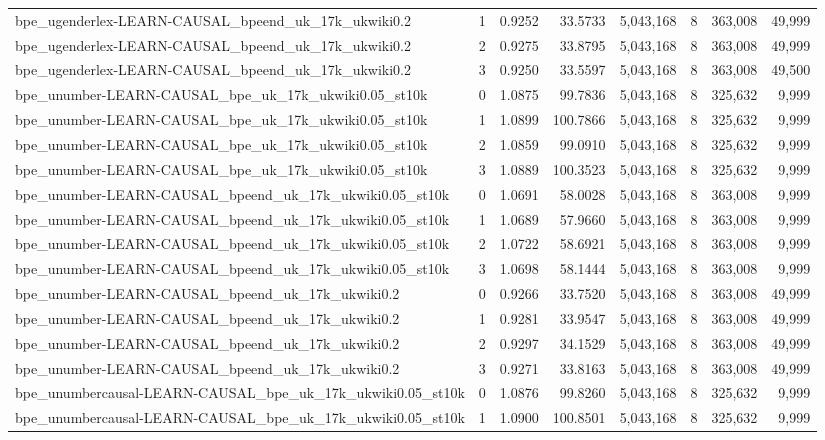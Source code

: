 \begin{tabular}{lrrrrrrr}
bpe\_ugenderlex-LEARN-CAUSAL\_bpeend\_uk\_17k\_ukwiki0.2 & 1 & 0.9252 & 33.5733 & 5,043,168 & 8 & 363,008 & 49,999 \\
bpe\_ugenderlex-LEARN-CAUSAL\_bpeend\_uk\_17k\_ukwiki0.2 & 2 & 0.9275 & 33.8795 & 5,043,168 & 8 & 363,008 & 49,999 \\
bpe\_ugenderlex-LEARN-CAUSAL\_bpeend\_uk\_17k\_ukwiki0.2 & 3 & 0.9250 & 33.5597 & 5,043,168 & 8 & 363,008 & 49,500 \\
bpe\_unumber-LEARN-CAUSAL\_bpe\_uk\_17k\_ukwiki0.05\_st10k & 0 & 1.0875 & 99.7836 & 5,043,168 & 8 & 325,632 & 9,999 \\
bpe\_unumber-LEARN-CAUSAL\_bpe\_uk\_17k\_ukwiki0.05\_st10k & 1 & 1.0899 & 100.7866 & 5,043,168 & 8 & 325,632 & 9,999 \\
bpe\_unumber-LEARN-CAUSAL\_bpe\_uk\_17k\_ukwiki0.05\_st10k & 2 & 1.0859 & 99.0910 & 5,043,168 & 8 & 325,632 & 9,999 \\
bpe\_unumber-LEARN-CAUSAL\_bpe\_uk\_17k\_ukwiki0.05\_st10k & 3 & 1.0889 & 100.3523 & 5,043,168 & 8 & 325,632 & 9,999 \\
bpe\_unumber-LEARN-CAUSAL\_bpeend\_uk\_17k\_ukwiki0.05\_st10k & 0 & 1.0691 & 58.0028 & 5,043,168 & 8 & 363,008 & 9,999 \\
bpe\_unumber-LEARN-CAUSAL\_bpeend\_uk\_17k\_ukwiki0.05\_st10k & 1 & 1.0689 & 57.9660 & 5,043,168 & 8 & 363,008 & 9,999 \\
bpe\_unumber-LEARN-CAUSAL\_bpeend\_uk\_17k\_ukwiki0.05\_st10k & 2 & 1.0722 & 58.6921 & 5,043,168 & 8 & 363,008 & 9,999 \\
bpe\_unumber-LEARN-CAUSAL\_bpeend\_uk\_17k\_ukwiki0.05\_st10k & 3 & 1.0698 & 58.1444 & 5,043,168 & 8 & 363,008 & 9,999 \\
bpe\_unumber-LEARN-CAUSAL\_bpeend\_uk\_17k\_ukwiki0.2 & 0 & 0.9266 & 33.7520 & 5,043,168 & 8 & 363,008 & 49,999 \\
bpe\_unumber-LEARN-CAUSAL\_bpeend\_uk\_17k\_ukwiki0.2 & 1 & 0.9281 & 33.9547 & 5,043,168 & 8 & 363,008 & 49,999 \\
bpe\_unumber-LEARN-CAUSAL\_bpeend\_uk\_17k\_ukwiki0.2 & 2 & 0.9297 & 34.1529 & 5,043,168 & 8 & 363,008 & 49,999 \\
bpe\_unumber-LEARN-CAUSAL\_bpeend\_uk\_17k\_ukwiki0.2 & 3 & 0.9271 & 33.8163 & 5,043,168 & 8 & 363,008 & 49,999 \\
bpe\_unumbercausal-LEARN-CAUSAL\_bpe\_uk\_17k\_ukwiki0.05\_st10k & 0 & 1.0876 & 99.8260 & 5,043,168 & 8 & 325,632 & 9,999 \\
bpe\_unumbercausal-LEARN-CAUSAL\_bpe\_uk\_17k\_ukwiki0.05\_st10k & 1 & 1.0900 & 100.8501 & 5,043,168 & 8 & 325,632 & 9,999 \\

\end{tabular}
